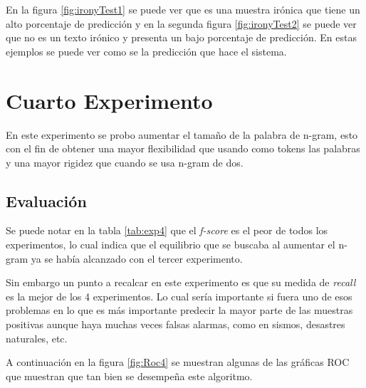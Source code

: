 \par En la figura \ref{fig:ironyTest1} se puede ver que es una muestra irónica que tiene un alto porcentaje de predicción y en la segunda figura \ref{fig:ironyTest2} se puede ver que no es un texto irónico y presenta un bajo porcentaje de predicción. En estas ejemplos se puede ver como se la predicción que hace el sistema.

\section{Cuarto Experimento}

\par En este experimento se probo aumentar el tamaño de la palabra de n-gram, esto con el fin de obtener una mayor flexibilidad que usando como tokens las palabras y una mayor rigidez que cuando se usa n-gram de dos.

\subsection{Evaluación}

\begin{center}
	
\end{center}

\par Se puede notar en la tabla \ref{tab:exp4} que el \textit{f-score} es el peor de todos los experimentos, lo cual indica que el equilibrio que se buscaba al aumentar el n-gram ya se había alcanzado con el tercer experimento.

\par Sin embargo un punto a recalcar en este experimento es que su medida de \textit{recall} es la mejor de los 4 experimentos. Lo cual sería importante si fuera uno de esos problemas en lo que es más importante predecir la mayor parte de las muestras positivas aunque haya muchas veces falsas alarmas, como en sismos, desastres naturales, etc.

\par A continuación en la figura \ref{fig:Roc4}  se muestran algunas de las gráficas ROC que muestran que tan bien se desempeña este algoritmo.

